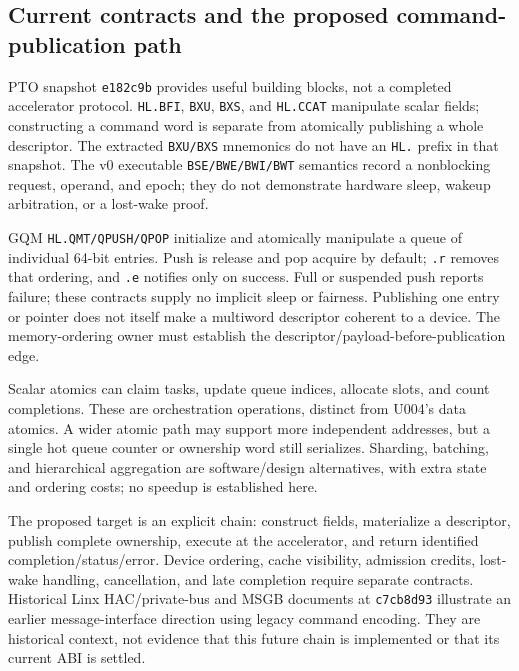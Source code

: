 \subsection{Current contracts and the proposed command-publication path}

PTO snapshot \texttt{e182c9b} provides useful building blocks, not a completed accelerator protocol. \texttt{HL.BFI}, \texttt{BXU}, \texttt{BXS}, and \texttt{HL.CCAT} manipulate scalar fields; constructing a command word is separate from atomically publishing a whole descriptor. The extracted \texttt{BXU/BXS} mnemonics do not have an \texttt{HL.} prefix in that snapshot. The v0 executable \texttt{BSE/BWE/BWI/BWT} semantics record a nonblocking request, operand, and epoch; they do not demonstrate hardware sleep, wakeup arbitration, or a lost-wake proof.\citep{u006-pto-fields,u006-pto-sys}

GQM \texttt{HL.QMT/QPUSH/QPOP} initialize and atomically manipulate a queue of individual 64-bit entries. Push is release and pop acquire by default; \texttt{.r} removes that ordering, and \texttt{.e} notifies only on success. Full or suspended push reports failure; these contracts supply no implicit sleep or fairness. Publishing one entry or pointer does not itself make a multiword descriptor coherent to a device. The memory-ordering owner must establish the descriptor/payload-before-publication edge.\citep{u006-pto-gqm}

Scalar atomics can claim tasks, update queue indices, allocate slots, and count completions. These are orchestration operations, distinct from U004's data atomics. A wider atomic path may support more independent addresses, but a single hot queue counter or ownership word still serializes. Sharding, batching, and hierarchical aggregation are software/design alternatives, with extra state and ordering costs; no speedup is established here.

The proposed target is an explicit chain: construct fields, materialize a descriptor, publish complete ownership, execute at the accelerator, and return identified completion/status/error. Device ordering, cache visibility, admission credits, lost-wake handling, cancellation, and late completion require separate contracts. Historical Linx HAC/private-bus and MSGB documents at \texttt{c7cb8d93} illustrate an earlier message-interface direction using legacy command encoding. They are historical context, not evidence that this future chain is implemented or that its current ABI is settled.\citep{u006-linx-hac,u006-linx-msgb}

